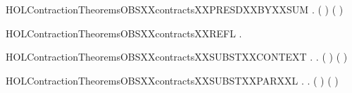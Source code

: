 \newcommand{\HOLContractionTheoremsOBSXXcontractsXXPRESDXXBYXXPAR}{\UseVerbatim{HOLContractionTheoremsOBSXXcontractsXXPRESDXXBYXXPAR}}
\begin{SaveVerbatim}{HOLContractionTheoremsOBSXXcontractsXXPRESDXXBYXXSUM}
\HOLTokenTurnstile{} \HOLSymConst{\HOLTokenForall{}}   .
          \HOLSymConst{\HOLTokenConj{}}    \HOLSymConst{\HOLTokenImp{}}
        ( \HOLSymConst{\ensuremath{+}} ) ( \HOLSymConst{\ensuremath{+}} )
\end{SaveVerbatim}
\newcommand{\HOLContractionTheoremsOBSXXcontractsXXPRESDXXBYXXSUM}{\UseVerbatim{HOLContractionTheoremsOBSXXcontractsXXPRESDXXBYXXSUM}}
\begin{SaveVerbatim}{HOLContractionTheoremsOBSXXcontractsXXREFL}
\HOLTokenTurnstile{} \HOLSymConst{\HOLTokenForall{}}.   
\end{SaveVerbatim}
\newcommand{\HOLContractionTheoremsOBSXXcontractsXXREFL}{\UseVerbatim{HOLContractionTheoremsOBSXXcontractsXXREFL}}
\begin{SaveVerbatim}{HOLContractionTheoremsOBSXXcontractsXXSUBSTXXCONTEXT}
\HOLTokenTurnstile{} \HOLSymConst{\HOLTokenForall{}} .
          \HOLSymConst{\HOLTokenImp{}}
       \HOLSymConst{\HOLTokenForall{}}.   \HOLSymConst{\HOLTokenImp{}}  ( ) ( )
\end{SaveVerbatim}
\newcommand{\HOLContractionTheoremsOBSXXcontractsXXSUBSTXXCONTEXT}{\UseVerbatim{HOLContractionTheoremsOBSXXcontractsXXSUBSTXXCONTEXT}}
\begin{SaveVerbatim}{HOLContractionTheoremsOBSXXcontractsXXSUBSTXXPARXXL}
\HOLTokenTurnstile{} \HOLSymConst{\HOLTokenForall{}} .
          \HOLSymConst{\HOLTokenImp{}}
       \HOLSymConst{\HOLTokenForall{}}.  ( \HOLSymConst{\ensuremath{\parallel}} ) ( \HOLSymConst{\ensuremath{\parallel}} )
\end{SaveVerbatim}
